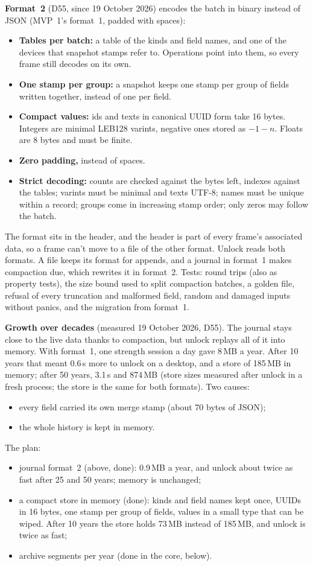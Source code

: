 \documentclass[11pt,a4paper]{article}
\newcommand{\dref}[1]{\textsf{#1}} %
\begin{document}
\noindent\textbf{Format~2} (\dref{D55}, since 19 October 2026) encodes the batch in binary instead of JSON (MVP~1's format~1, padded with spaces):
\begin{itemize}
  \item \textbf{Tables per batch:} a table of the kinds and field names, and one of the devices that snapshot stamps refer to. Operations point into them, so every frame still decodes on its own.
  \item \textbf{One stamp per group:} a snapshot keeps one stamp per group of fields written together, instead of one per field.
  \item \textbf{Compact values:} ids and texts in canonical UUID form take 16 bytes. Integers are minimal LEB128 varints, negative ones stored as $-1-n$. Floats are 8 bytes and must be finite.
  \item \textbf{Zero padding,} instead of spaces.
  \item \textbf{Strict decoding:} counts are checked against the bytes left, indexes against the tables; varints must be minimal and texts UTF-8; names must be unique within a record; groups come in increasing stamp order; only zeros may follow the batch.
\end{itemize}
The format sits in the header, and the header is part of every frame's associated data, so a frame can't move to a file of the other format. Unlock reads both formats. A file keeps its format for appends, and a journal in format~1 makes compaction due, which rewrites it in format~2. Tests: round trips (also as property tests), the size bound used to split compaction batches, a golden file, refusal of every truncation and malformed field, random and damaged inputs without panics, and the migration from format~1.

\noindent\textbf{Growth over decades} (measured 19 October 2026, \dref{D55}). The journal stays close to the live data thanks to compaction, but unlock replays all of it into memory. With format~1, one strength session a day gave 8\,MB a year. After 10 years that meant 0.6\,s more to unlock on a desktop, and a store of 185\,MB in memory; after 50 years, 3.1\,s and 874\,MB (store sizes measured after unlock in a fresh process; the store is the same for both formats). Two causes:
\begin{itemize}
  \item every field carried its own merge stamp (about 70 bytes of JSON);
  \item the whole history is kept in memory.
\end{itemize}
The plan:
\begin{itemize}
  \item journal format~2 (above, done): 0.9\,MB a year, and unlock about twice as fast after 25 and 50 years; memory is unchanged;
  \item a compact store in memory (done): kinds and field names kept once, UUIDs in 16 bytes, one stamp per group of fields, values in a small type that can be wiped. After 10 years the store holds 73\,MB instead of 185\,MB, and unlock is twice as fast;
  \item archive segments per year (done in the core, below).
\end{itemize}
\end{document}

